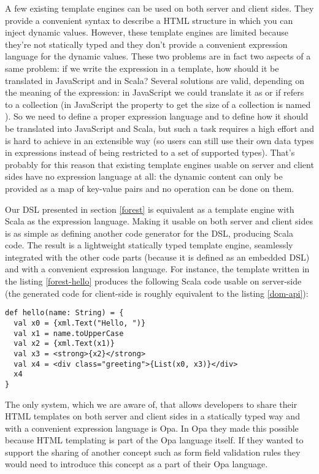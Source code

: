 \documentclass[american,english,runningheads]{llncs}
\begin{document}
A few existing template engines can be used on both server and client sides. They provide a convenient syntax to describe a HTML structure in which you can inject dynamic values. However, these template engines are limited because they’re not statically typed and they don’t provide a convenient expression language for the dynamic values. These two problems are in fact two aspects of a same problem: if we write the expression  in a template, how should it be translated in JavaScript and in Scala? Several solutions are valid, depending on the meaning of the expression: in JavaScript we could translate it as  or  if  refers to a collection (in JavaScript the property to get the size of a collection is named ). So we need to define a proper expression language and to define how it should be translated into JavaScript and Scala, but such a task requires a high effort and is hard to achieve in an extensible way (so users can still use their own data types in expressions instead of being restricted to a set of supported types). That’s probably for this reason that existing template engines usable on server and client sides have no expression language at all: the dynamic content can only be provided as a map of key-value pairs and no operation can be done on them.

Our DSL presented in section \ref{forest} is equivalent as a template engine with Scala as the expression language. Making it usable on both server and client sides is as simple as defining another code generator for the DSL, producing Scala code. The result is a lightweight statically typed template engine, seamlessly integrated with the other code parts (because it is defined as an embedded DSL) and with a convenient expression language. For instance, the template written in the listing \ref{forest-hello} produces the following Scala code usable on server-side (the generated code for client-side is roughly equivalent to the listing \ref{dom-api}):

\begin{lstlisting}
def hello(name: String) = {
  val x0 = {xml.Text("Hello, ")}
  val x1 = name.toUpperCase
  val x2 = {xml.Text(x1)}
  val x3 = <strong>{x2}</strong>
  val x4 = <div class="greeting">{List(x0, x3)}</div>
  x4
}
\end{lstlisting}

The only system, which we are aware of, that allows developers to share their HTML templates on both server and client sides in a statically typed way and with a convenient expression language is Opa. In Opa they made this possible because HTML templating is part of the Opa language itself. If they wanted to support the sharing of another concept such as form field validation rules they would need to introduce this concept as a part of their Opa language.
\end{document}
